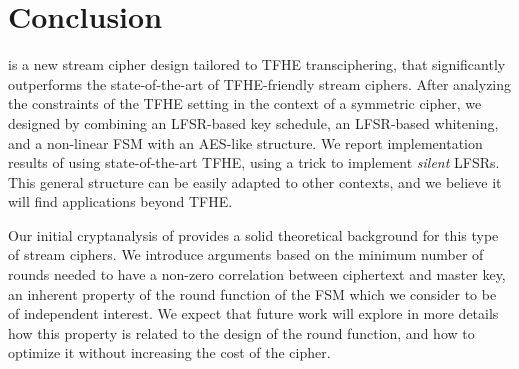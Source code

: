 \section{Conclusion}
\label{sec:conclusion}


\coolName{} is a new stream cipher design tailored to TFHE
transciphering, that significantly outperforms the state-of-the-art of
TFHE-friendly stream ciphers.  After analyzing the constraints of the
TFHE setting in the context of a symmetric cipher, we designed
\coolName{} by combining an LFSR-based key schedule, an LFSR-based
whitening, and a non-linear FSM with an AES-like structure.  We report
implementation results of \coolName{} using state-of-the-art TFHE, using
a trick to implement \emph{silent} LFSRs.  This general structure can be
easily adapted to other contexts, and we believe it will find
applications beyond TFHE.

Our initial cryptanalysis of \coolName{} provides a solid
theoretical background for this type of stream ciphers.  We introduce
arguments based on the minimum number of rounds needed to have a
non-zero correlation between ciphertext and master key, an inherent
property of the round function of the FSM which we consider to be of
independent interest.  We expect that future work will explore in more
details how this property is related to the design of the round
function, and how to optimize it without increasing the cost of the
cipher.


